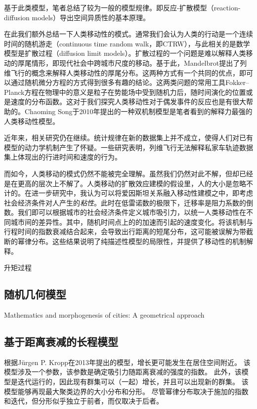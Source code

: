 基于此类模型，笔者总结了较为一般的模型规律。即反应-扩散模型（reaction-diffusion models）导出空间异质性的基本原理。



在此我们额外总结一下人类移动性的模式。通常我们会认为人类的行动是一个连续时间的随机游走（continuous time random walk，即CTRW），与此相关的是数学模型是扩散过程（diffusion limit models）。扩散过程的一个问题是难以解释人类移动的厚尾情形，即现代社会中跨城市尺度的移动。基于此，Mandelbrot提出了列维飞行的概念\cite{doi:10.1142/S0218127408021877}来解释人类移动性的厚尾分布。这两种方式有一个共同的优点，即可以通过随机微分方程的方式得到很多有趣的结论。这两类问题的常用工具Fokker–Planck方程在物理中的意义是粒子在势能场中受到随机力后，随时间演化的位置或是速度的分布函数。这对于我们探究人类移动性对于偶发事件的反应也是有很大帮助的。Chaoming Song于2010年提出的一种双机制模型\cite{song2010modelling}是笔者看到的解释力最强的人类移动性模型。

近年来，相关研究仍在继续。统计规律在新的数据集上并不成立，使得人们对已有模型的动力学机制产生了怀疑。一些研究\cite{GallottiA}表明，列维飞行无法解释私家车轨迹数据集上体现出的行进时间和速度的行为。

而如今，人类移动的模式仍然不能被完全理解。虽然我们仍然对此不解，但却已经是在更高的层次上不解了。人类移动的扩散效应建模的假设里，人的大小是忽略不计的。在进一步研究中，我认为可以将爱因斯坦关系\cite{doi:10.1002/andp.18551700105}融入移动性建模之中，即考虑社会经济条件对人产生的\emph{粘性}。此时在低雷诺数的极限下，迁移率是阻力系数的倒数。我们即可以根据城市的社会经济条件定义城市吸引力，以统一人类移动性在不同城市间的差异性。其中，随机时间点上的的加速而引起的速度变化。将该机制与行程时间的指数衰减结合起来，会导致出行距离的短尾分布，这可能被误解为带截断的幂律分布。这些结果说明了纯描述性模型的局限性，并提供了移动性的机制解释。

升矩过程


\subsection{随机几何模型}

Mathematics and morphogenesis of cities: A geometrical approach

\subsection{基于距离衰减的长程模型}

根据Jürgen P. Kropp在2013年提出的模型\cite{PhysRevE.87.042114}，增长更可能发生在居住空间附近。 该模型涉及一个参数，该参数是确定吸引力随距离衰减的强度的指数。 此外，该模型是迭代运行的，因此现有群集可以（一起）增长，并且可以出现新的群集。 该模型能够再现最大聚类边界的大小分布和分形。 尽管幂律分布取决于施加的指数和迭代，但分形似乎独立于前者，而仅取决于后者。

